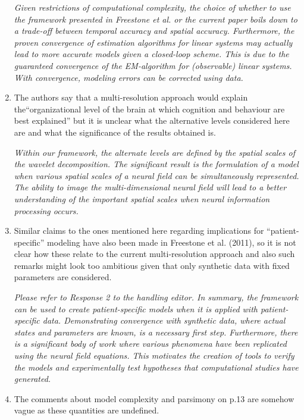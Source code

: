 \documentclass{article}
\begin{document}
\begin{enumerate}
\emph{Given restrictions of computational complexity, the choice of whether to use the framework presented in Freestone et al. or the current paper boils down to a trade-off between temporal accuracy and spatial accuracy. Furthermore, the proven convergence of estimation algorithms for linear systems may actually lead to more accurate models given a closed-loop scheme. This is due to the guaranteed convergence of the EM-algorithm for (observable) linear systems. With convergence, modeling errors can be corrected using data.}
				
        \item The authors say that a multi-resolution approach would explain the``organizational level of the brain at which cognition and behaviour are best explained'' but it is unclear what the alternative levels considered here are and what the significance of the results obtained is.

\emph{Within our framework, the alternate levels are defined by the spatial scales of the wavelet decomposition. The significant result is the formulation of a model when various spatial scales of a neural field can be simultaneously represented. The ability to image the multi-dimensional neural field will lead to a better understanding of the important spatial scales when neural information processing occurs.}

		\item Similar claims to the ones mentioned here regarding implications for ``patient-specific'' modeling have also been made in Freestone et al. (2011), so it is not clear how these relate to the current multi-resolution approach and also such remarks might look too ambitious given that only synthetic data with fixed parameters are considered.
				
	\emph{Please refer to Response 2 to the handling editor. In summary, the framework can be used to create patient-specific models when it is applied with patient-specific data. Demonstrating convergence with synthetic data, where actual states and parameters are known, is a necessary first step. Furthermore, there is a significant body of work where various phenomena have been replicated using the neural field equations. This motivates the creation of tools to verify the models and experimentally test hypotheses that computational studies have generated.}
				
	\item The comments about model complexity and parsimony on p.13 are somehow vague as these quantities are undefined.
				

\end{enumerate}
\end{document}
